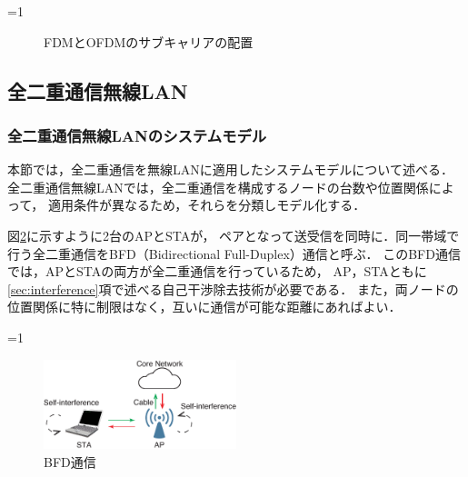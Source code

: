 \documentclass[master]{kuisthesis}		%
\newcounter{flagFig}
\begin{document}
			\ifnum\value{flagFig}=1 {\begin{figure}[htbp]
				\centering
				\hspace{20pt}
				\caption{FDMとOFDMのサブキャリアの配置}
				\label{fig:ofdm_ofdma}
			\end{figure}}\fi
	\subsection{全二重通信無線LAN}
		\subsubsection{全二重通信無線LANのシステムモデル}
			本節では，全二重通信を無線LANに適用したシステムモデルについて述べる．
			全二重通信無線LANでは，全二重通信を構成するノードの台数や位置関係によって，
			適用条件が異なるため，それらを分類しモデル化する．
			\par
			図\ref{fig:model_pair}に示すように2台のAPとSTAが，
			ペアとなって送受信を同時に．同一帯域で行う全二重通信をBFD（Bidirectional Full-Duplex）通信と呼ぶ．
			このBFD通信では，APとSTAの両方が全二重通信を行っているため，
			AP，STAともに\ref{sec:interference}項で述べる自己干渉除去技術が必要である．
			また，両ノードの位置関係に特に制限はなく，互いに通信が可能な距離にあればよい．

			\ifnum\value{flagFig}=1 {\begin{figure}[htbp]
				\begin{center}
					\includegraphics[width=0.5\textwidth]{fig/bfd.eps}
					\caption{BFD通信}
					\label{fig:model_pair}
				\end{center}
			\end{figure}}\fi
\end{document}

